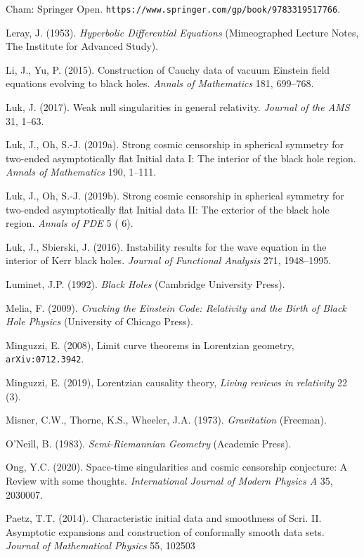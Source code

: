 \documentclass[12pt]{article}
\begin{document}
\begin{small}
\begin{thebibliography}{99}
Cham: Springer Open. \verb#https://www.springer.com/gp/book/9783319517766#.
\item[]  Leray, J. (1953).
 \emph{Hyperbolic Differential Equations} (Mimeographed Lecture Notes, The Institute for Advanced Study).
 \item[] Li, J.,  Yu, P. (2015). Construction of Cauchy data of vacuum Einstein field equations evolving to black holes.
\emph{ Annals of Mathematics} 181, 699--768. 
\item[] Luk, J. (2017). Weak null singularities in general relativity. \emph{Journal of the AMS} 31, 1--63. 
\item[] Luk, J., Oh, S.-J. (2019a). 
Strong cosmic censorship in spherical symmetry for two-ended asymptotically flat Initial data I: The interior of the black hole region. \emph{Annals of Mathematics} 190, 1--111.
\item[] Luk, J., Oh, S.-J. (2019b). 
Strong cosmic censorship in spherical symmetry for two-ended asymptotically flat Initial data II: The exterior of the black hole region. \emph{Annals of PDE} 5 ( 6).
\item[] Luk, J., Sbierski, J. (2016). Instability results for the wave equation in the interior of Kerr black holes.
\emph{Journal of Functional Analysis} 271, 1948--1995. 
 \item[]  Luminet, J.P. (1992). \emph{Black Holes} (Cambridge University Press). 
 \item[] Melia, F. (2009). \emph{Cracking the Einstein Code: Relativity and the Birth of Black Hole Physics} (University of Chicago Press). 
 \item[]  Minguzzi, E. (2008), Limit curve theorems in Lorentzian geometry, \texttt{arXiv:0712.3942}.
\item[]  Minguzzi, E. (2019),  Lorentzian causality theory, \emph{Living reviews in relativity} 22 (3). 
 \item[] Misner, C.W., Thorne,  K.S.,  Wheeler, J.A. (1973). 
 \emph{Gravitation} (Freeman).
\item[]  O'Neill, B. (1983). \emph{Semi-Riemannian Geometry} (Academic Press).
\item[] Ong, Y.C. (2020). Space-time singularities and cosmic censorship conjecture: A Review with some thoughts.
\emph{International Journal of Modern Physics A} 35, 2030007. 
\item[]  Paetz, T.T. (2014). Characteristic initial data and smoothness of Scri. II. Asymptotic expansions and construction of conformally smooth data sets. \emph{Journal of Mathematical Physics}  55, 102503

\end{thebibliography}
\end{small}
\end{document}
